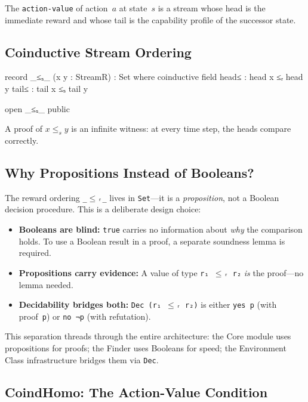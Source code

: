 \documentclass[9pt,a4paper]{article}
\theoremstyle{plain}
\theoremstyle{definition}
\theoremstyle{remark}
\begin{document}
The \texttt{action-value} of action~$a$ at state~$s$ is a stream whose head is the immediate reward and whose tail is the capability profile of the successor state.

\subsection{Coinductive Stream Ordering}

\begin{code}
  record _≤ₛ_ (x y : StreamR) : Set where
    coinductive
    field
      head≤ : head x ≤ᵣ head y
      tail≤ : tail x ≤ₛ tail y

  open _≤ₛ_ public
\end{code}

\noindent A proof of $x \le_s y$ is an infinite witness: at every time step, the heads compare correctly.

\subsection{Why Propositions Instead of Booleans?}\label{sec:props-vs-bools}

The reward ordering \texttt{\_$\le$ᵣ\_} lives in \texttt{Set}---it is a \emph{proposition}, not a Boolean decision procedure.  This is a deliberate design choice:

\begin{itemize}
\item \textbf{Booleans are blind:} \texttt{true} carries no information about \emph{why} the comparison holds.  To use a Boolean result in a proof, a separate soundness lemma is required.
\item \textbf{Propositions carry evidence:} A value of type \texttt{r₁ $\le$ᵣ r₂} \emph{is} the proof---no lemma needed.
\item \textbf{Decidability bridges both:} \texttt{Dec (r₁ $\le$ᵣ r₂)} is either \texttt{yes p} (with proof~\texttt{p}) or \texttt{no ¬p} (with refutation).
\end{itemize}

\noindent This separation threads through the entire architecture: the Core module uses propositions for proofs; the Finder uses Booleans for speed; the Environment Class infrastructure bridges them via \texttt{Dec}.

\subsection{CoindHomo: The Action-Value Condition}
\end{document}
